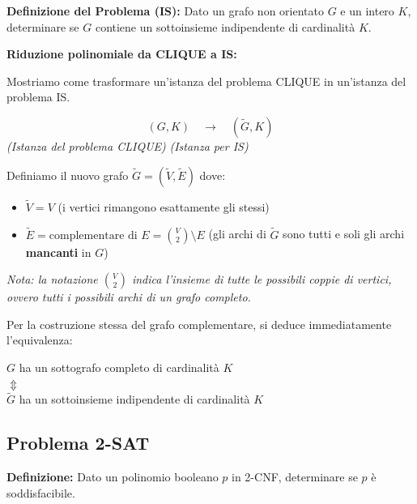 \vspace{0.4cm}
\textbf{Definizione del Problema (IS):} Dato un grafo non orientato $G$ e un intero $K$, determinare se $G$ contiene un sottoinsieme indipendente di cardinalità $K$.

\vspace{0.6cm}
\textbf{Riduzione polinomiale da CLIQUE a IS:}

Mostriamo come trasformare un'istanza del problema CLIQUE in un'istanza del problema IS.

$$ (G, K) \quad \longrightarrow \quad (\tilde{G}, K) $$
\textit{(Istanza del problema CLIQUE)} \hspace{1cm} \textit{(Istanza per IS)}

\vspace{0.3cm}
Definiamo il nuovo grafo $\tilde{G} = (\tilde{V}, \tilde{E})$ dove:
\begin{itemize}
    \item $\tilde{V} = V$ \quad (i vertici rimangono esattamente gli stessi)
    \item $\tilde{E} = \text{complementare di } E = \binom{V}{2} \setminus E$ \quad (gli archi di $\tilde{G}$ sono tutti e soli gli archi \textbf{mancanti} in $G$)
\end{itemize}
\textit{Nota: la notazione $\binom{V}{2}$ indica l'insieme di tutte le possibili coppie di vertici, ovvero tutti i possibili archi di un grafo completo.}

\vspace{0.4cm}
Per la costruzione stessa del grafo complementare, si deduce immediatamente l'equivalenza:
\begin{center}
    $G$ ha un sottografo completo di cardinalità $K$ \\
    $\Updownarrow$ \\
    $\tilde{G}$ ha un sottoinsieme indipendente di cardinalità $K$
\end{center}











\vspace{0.8cm}

\subsection{Problema 2-SAT}

\textbf{Definizione:} Dato un polinomio booleano $p$ in 2-CNF, determinare se $p$ è soddisfacibile.

